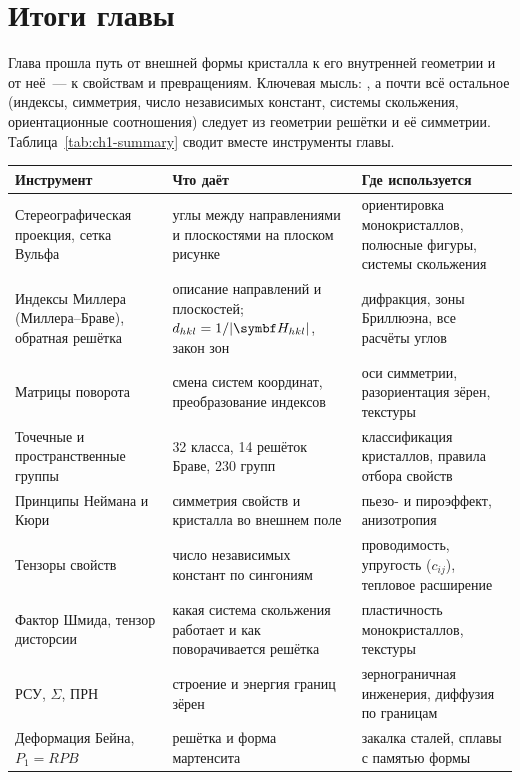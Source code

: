\clearpage
\section*{Итоги главы}

Глава прошла путь от внешней формы кристалла к его внутренней геометрии
и от неё~— к свойствам и превращениям. Ключевая мысль: , а почти всё остальное (индексы, симметрия,
число независимых констант, системы скольжения, ориентационные
соотношения) следует из геометрии решётки и её симметрии.
Таблица~\ref{tab:ch1-summary} сводит вместе инструменты главы.

\medskip\noindent\begin{minipage}{\textwidth}
\centering
{}
\label{tab:ch1-summary}
\footnotesize
\begin{tabularx}{\textwidth}{@{}>{\raggedright\arraybackslash\hspace{0pt}}p{30mm}>{\raggedright\arraybackslash\hspace{0pt}}X>{\raggedright\arraybackslash\hspace{0pt}}p{40mm}@{}}
\toprule
Инструмент & Что даёт & Где используется \\
\midrule
Стереографическая проекция, сетка Вульфа & углы между направлениями и плоскостями на плоском рисунке & ориентировка монокристаллов, полюсные фигуры, системы скольжения \\
Индексы Миллера (Миллера--Браве), обратная решётка & описание направлений и плоскостей; $d_{hkl}=1/|\vb H_{hkl}|$, закон зон & дифракция, зоны Бриллюэна, все расчёты углов \\
Матрицы поворота & смена систем координат, преобразование индексов & оси симметрии, разориентация зёрен, текстуры \\
Точечные и пространственные группы & 32 класса, 14 решёток Браве, 230 групп & классификация кристаллов, правила отбора свойств \\
Принципы Неймана и Кюри & симметрия свойств и кристалла во внешнем поле & пьезо- и пироэффект, анизотропия \\
Тензоры свойств & число независимых констант по сингониям & проводимость, упругость ($c_{ij}$), тепловое расширение \\
Фактор Шмида, тензор дисторсии & какая система скольжения работает и как поворачивается решётка & пластичность монокристаллов, текстуры \\
РСУ, $\Sigma$, ПРН & строение и энергия границ зёрен & зернограничная инженерия, диффузия по границам \\
Деформация Бейна, $P_1=RPB$ & решётка и форма мартенсита & закалка сталей, сплавы с памятью формы \\
\bottomrule
\end{tabularx}
\end{minipage}


